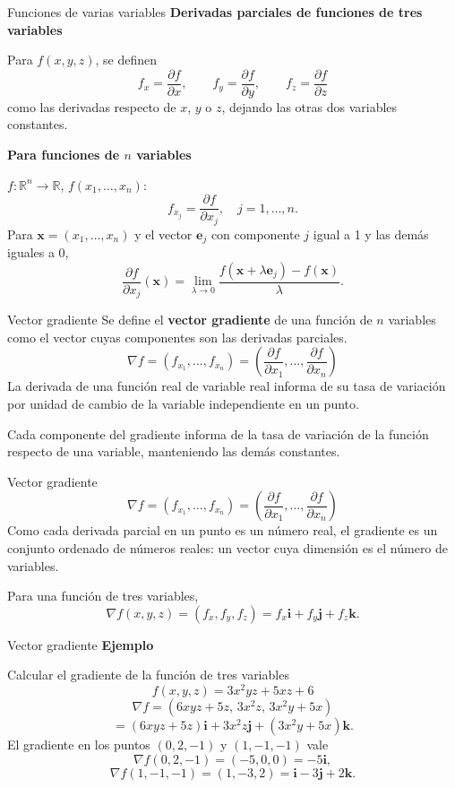 \documentclass[main.tex]{subfiles}
\begin{document}
\begin{frame}{Funciones de varias variables}
\small\textbf{Derivadas parciales de funciones de tres variables}\par Para $f(x,y,z)$, se definen
\[f_x=\frac{\partial f}{\partial x},\qquad f_y=\frac{\partial f}{\partial y},\qquad f_z=\frac{\partial f}{\partial z}\]
como las derivadas respecto de $x$, $y$ o $z$, dejando las otras dos variables constantes.
\medskip

\textbf{Para funciones de $n$ variables}\par $f:\mathbb R^n\to\mathbb R$, $f(x_1,\ldots,x_n)$:
\[f_{x_j}=\frac{\partial f}{\partial x_j},\quad j=1,\ldots,n.\]
Para $\mathbf x=(x_1,\ldots,x_n)$ y el vector $\mathbf e_j$ con componente $j$ igual a 1 y las demás iguales a 0,
\[\frac{\partial f}{\partial x_j}(\mathbf x)=\lim_{\lambda\to0}\frac{f(\mathbf x+\lambda\mathbf e_j)-f(\mathbf x)}{\lambda}.\]
\end{frame}
\begin{frame}{Vector gradiente}
\small Se define el \textbf{vector gradiente} de una función de $n$ variables como el vector cuyas componentes son las derivadas parciales.
\[\nabla f=(f_{x_1},\ldots,f_{x_n})=\left(\frac{\partial f}{\partial x_1},\ldots,\frac{\partial f}{\partial x_n}\right)\]
La derivada de una función real de variable real informa de su tasa de variación por unidad de cambio de la variable independiente en un punto.
\medskip

Cada componente del gradiente informa de la tasa de variación de la función respecto de una variable, manteniendo las demás constantes.
\end{frame}
\begin{frame}{Vector gradiente}
\small\[\nabla f=(f_{x_1},\ldots,f_{x_n})=\left(\frac{\partial f}{\partial x_1},\ldots,\frac{\partial f}{\partial x_n}\right)\]
Como cada derivada parcial en un punto es un número real, el gradiente es un conjunto ordenado de números reales: un vector cuya dimensión es el número de variables.
\medskip

Para una función de tres variables,
\[\nabla f(x,y,z)=(f_x,f_y,f_z)=f_x\mathbf i+f_y\mathbf j+f_z\mathbf k.\]
\end{frame}
\begin{frame}{Vector gradiente}
\small\textbf{Ejemplo}\par Calcular el gradiente de la función de tres variables
\[f(x,y,z)=3x^2yz+5xz+6\]
\[\nabla f=(6xyz+5z,\,3x^2z,\,3x^2y+5x)\]
\[=(6xyz+5z)\mathbf i+3x^2z\mathbf j+(3x^2y+5x)\mathbf k.\]
El gradiente en los puntos $(0,2,-1)$ y $(1,-1,-1)$ vale
\[\nabla f(0,2,-1)=(-5,0,0)=-5\mathbf i,\]
\[\nabla f(1,-1,-1)=(1,-3,2)=\mathbf i-3\mathbf j+2\mathbf k.\]
\end{frame}
\end{document}
